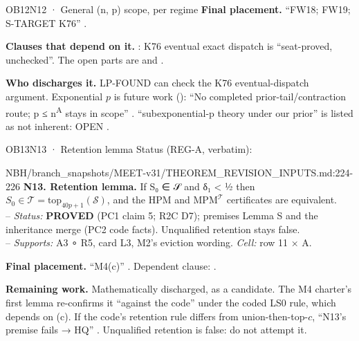 \begin{card}{OB12}{N12 · General (n, p) scope, per regime}
\textbf{Final placement.} ``FW18; FW19; S-TARGET K76'' .

\textbf{Clauses that depend on it.} : K76 eventual exact dispatch is ``seat-proved, unchecked''. The open parts are  and .

\textbf{Who discharges it.} LP-FOUND can check the K76 eventual-dispatch argument. Exponential $p$ is future work (): ``No completed prior-tail/contraction route; p ≤ n\textsuperscript{A} stays in scope'' . ``subexponential-p theory under our prior'' is listed as not inherent: OPEN .
\end{card}

\begin{card}{OB13}{N13 · Retention lemma}
Status (REG-A, verbatim):  
\begin{stmt}{NBH/branch_snapshots/MEET-v31/THEOREM_REVISION_INPUTS.md:224-226}
\textbf{N13. Retention lemma.} If S₀ ∈ 𝒮 and δ₁ < ½ then $S_0 ∈ 𝒯 = \mathrm{top}_{40p+1}(𝒮)$, and the HPM and $\mathrm{MPM}^{𝒯}$ certificates are equivalent.\\
– \emph{Status:} \textbf{PROVED} (PC1 claim 5; R2C D7); premises Lemma S and the inheritance merge (PC2 code facts). Unqualified retention stays false.\\
– \emph{Supports:} A3 ∘ R5, card L3, M2's eviction wording. \emph{Cell:} row 11 × A.
\end{stmt}
\textbf{Final placement.} ``M4(c)'' . Dependent clause: .

\textbf{Remaining work.} Mathematically discharged, as a candidate. The M4 charter's first lemma re-confirms it ``against the code'' under the coded LS0 rule, which depends on (c). If the code's retention rule differs from union-then-top-$c$, ``N13's premise fails → HQ'' . Unqualified retention is false: do not attempt it.
\end{card}

